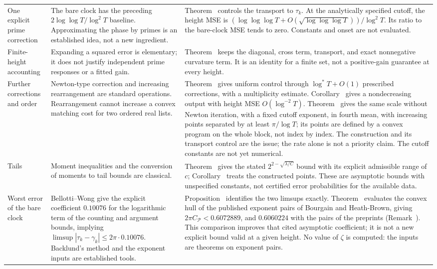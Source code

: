 \documentclass[preprint,12pt]{elsarticle}
\makeatletter
\let\CG@origref\ref
\newcommand{\CG@gettip}[1]{\@ifundefined{CGTip@#1}{Reference: #1}{\csname CGTip@#1\endcsname}}
\DeclareRobustCommand{\CGref}[1]{\pdftooltip{\CG@origref{#1}}{\CG@gettip{#1}}}
\numberwithin{equation}{section}
\theoremstyle{plain}
\theoremstyle{definition}
\theoremstyle{remark}
\makeatother
\begin{document}
\begin{longtable}{@{}p{}p{}p{}@{}}
One explicit prime correction
& The bare clock has the preceding $2\log\log T/\log^2T$ baseline. Approximating the phase by primes is an established idea, not a new ingredient.
& Theorem~\CGref{thm:computable_clock} controls the transport to $\tau_k$. At the analytically specified cutoff, the height MSE is $(\log\log\log T+O(\sqrt{\log\log\log T}))/\log^2T$. Its ratio to the bare-clock MSE tends to zero. Constants and onset are not evaluated.\\
Finite-height accounting
& Expanding a squared error is elementary; it does not justify independent prime responses or a fitted gain.
& Theorem~\CGref{thm:accounting} keeps the diagonal, cross term, transport, and exact nonnegative curvature term. It is an identity for a finite set, not a positive-gain guarantee at every height.\\
Further corrections and order
& Newton-type correction and increasing rearrangement are standard operations. Rearrangement cannot increase a convex matching cost for two ordered real lists.
& Theorem~\CGref{thm:uniform_iteration} gives uniform control through $\log^*T+O(1)$ prescribed corrections, with a multiplicity estimate. Corollary~\CGref{cor:sorted_clock} gives a nondecreasing output with height MSE $O(\log^{-2}T)$. Theorem~\CGref{thm:regularized_clock} gives the same scale without Newton iteration, with a fixed cutoff exponent, in fourth mean, with increasing points separated by at least $\pi/\log T$; its points are defined by a convex program on the whole block, not index by index. The construction and its transport control are the issue; the rate alone is not a priority claim. The cutoff constants are not yet numerical.\\
Tails
& Moment inequalities and the conversion of moments to tail bounds are classical.
& Theorem~\CGref{thm:tails} gives the stated $2^{2-\sqrt{\lambda/C}}$ bound with its explicit admissible range of $c$; Corollary~\CGref{cor:clock_tails} treats the constructed points. These are asymptotic bounds with unspecified constants, not certified error probabilities for the available data.\\
Worst error of the bare clock
& Bellotti--Wong \cite[Thm.~1.1, Cor.~1.5]{BellottiWong2025} give the explicit coefficient $0.10076$ for the logarithmic term of the counting and argument bounds, implying $\limsup|\tau_k-\gamma_k|\le2\pi\cdot0.10076$. Backlund's method and the exponent inputs are established tools.
& Proposition~\CGref{prop:envelope_equivalence} identifies the two limsups exactly. Theorem~\CGref{thm:envelope} evaluates the convex hull of the published exponent pairs of Bourgain and Heath-Brown, giving $2\pi C_{\mathcal P}<0.6072889$, and $0.6060224$ with the pairs of the preprints \cite{TrudgianYang2023,TaoTrudgianYang2025} (Remark~\CGref{rem:envelope_inputs}). This comparison improves that cited asymptotic coefficient; it is not a new explicit bound valid at a given height. No value of $\zeta$ is computed: the inputs are theorems on exponent pairs.\\

\end{longtable}
\end{document}
